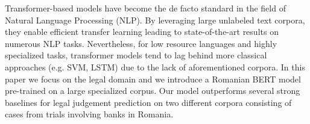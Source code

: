 Transformer-based models have become the de facto standard in the field of Natural Language Processing (NLP). By leveraging large unlabeled text corpora, they enable efficient transfer learning leading to state-of-the-art results on numerous NLP tasks. Nevertheless, for low resource languages and highly specialized tasks, transformer models tend to lag behind more classical approaches (e.g. SVM, LSTM) due to the lack of aforementioned corpora. In this paper we focus on the legal domain and we introduce a Romanian BERT model pre-trained on a large specialized corpus. Our model outperforms several strong baselines for legal judgement prediction on two different corpora consisting of cases from trials involving banks in Romania.
